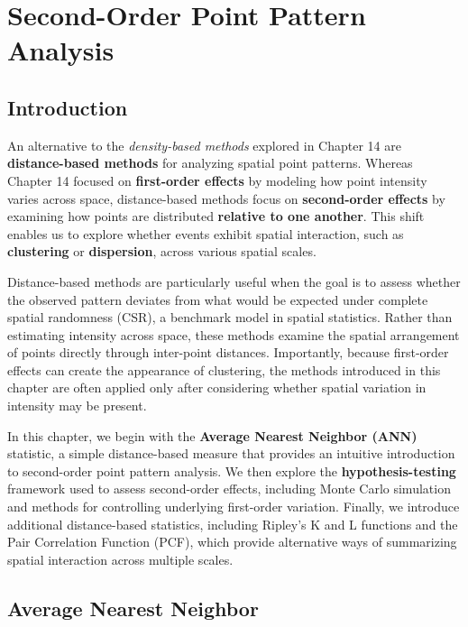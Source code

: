 \documentclass[
  letterpaper,
]{book}
\begin{document}
\chapter{Second-Order Point Pattern
Analysis}\label{second-order-point-pattern-analysis}

\section{Introduction}\label{introduction-14}

An alternative to the \emph{density-based methods} explored in Chapter
14 are \textbf{distance-based methods} for analyzing spatial point
patterns. Whereas Chapter 14 focused on \textbf{first-order effects} by
modeling how point intensity varies across space, distance-based methods
focus on \textbf{second-order effects} by examining how points are
distributed \textbf{relative to one another}. This shift enables us to
explore whether events exhibit spatial interaction, such as
\textbf{clustering} or \textbf{dispersion}, across various spatial
scales.

Distance-based methods are particularly useful when the goal is to
assess whether the observed pattern deviates from what would be expected
under complete spatial randomness (CSR), a benchmark model in spatial
statistics. Rather than estimating intensity across space, these methods
examine the spatial arrangement of points directly through inter-point
distances. Importantly, because first-order effects can create the
appearance of clustering, the methods introduced in this chapter are
often applied only after considering whether spatial variation in
intensity may be present.

In this chapter, we begin with the \textbf{Average Nearest Neighbor
(ANN)} statistic, a simple distance-based measure that provides an
intuitive introduction to second-order point pattern analysis. We then
explore the \textbf{hypothesis-testing} framework used to assess
second-order effects, including Monte Carlo simulation and methods for
controlling underlying first-order variation. Finally, we introduce
additional distance-based statistics, including Ripley's K and L
functions and the Pair Correlation Function (PCF), which provide
alternative ways of summarizing spatial interaction across multiple
scales.

\section{Average Nearest Neighbor}\label{average-nearest-neighbor}
\end{document}
